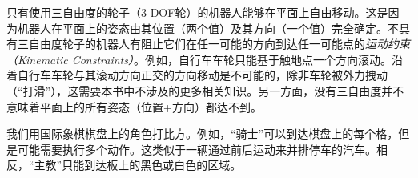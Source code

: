 
只有使用三自由度的轮子（3-DOF轮）的机器人能够在平面上自由移动。这是因为机器人在平面上的姿态由其位置（两个值）及其方向（一个值）完全确定。不具有三自由度轮子的机器人有阻止它们在任一可能的方向到达任一可能点的\emph{运动约束（Kinematic Constraints）}。例如，自行车车轮只能基于触地点一个方向滚动。沿着自行车车轮与其滚动方向正交的方向移动是不可能的，除非车轮被外力拽动（“打滑”），这需要本书中不涉及的更多相关知识。另一方面，没有三自由度并不意味着平面上的所有姿态（位置+方向）都达不到。


我们用国际象棋棋盘上的角色打比方。例如，“骑士”可以到达棋盘上的每个格，但是可能需要执行多个动作。这类似于一辆通过前后运动来并排停车的汽车。相反，“主教”只能到达板上的黑色或白色的区域。


